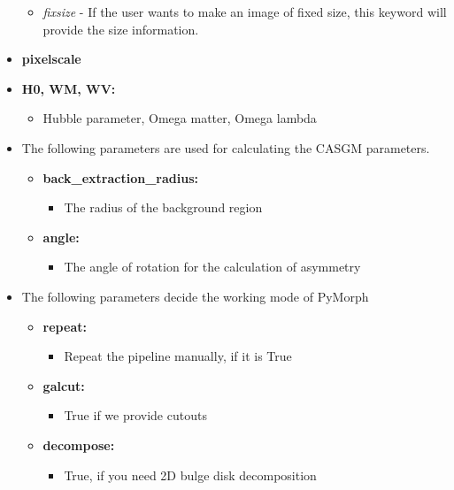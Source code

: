 \documentclass[a4paper,12pt]{article}
\begin{document}
\begin{itemize}
\begin{itemize}
\item \textit{ fixsize} - If the user wants to make an image of fixed size,
 this keyword will provide the size information.

\end{itemize}

\item \textbf{pixelscale}
\item \textbf{H0, WM, WV:}
\begin{itemize}
\item[] Hubble parameter, Omega matter, Omega lambda
\end{itemize}

\item The following parameters are used for calculating the CASGM parameters.
\begin{itemize}
\item[] \textbf{back\_extraction\_radius:}
\begin{itemize}
\item The radius of the background region
\end{itemize}
\item[] \textbf{angle:}
\begin{itemize}
\item The angle of rotation for the calculation of asymmetry
\end{itemize}

\end{itemize}

\item The following parameters decide the working mode of PyMorph
\begin{itemize}
\item[] \textbf{repeat:}
\begin{itemize}
\item Repeat the pipeline manually, if it is True
\end{itemize}

\item[] \textbf{galcut:}
\begin{itemize}
\item True if we provide cutouts
\end{itemize}

\item[] \textbf{decompose:}
\begin{itemize}
\item True, if you need 2D bulge disk decomposition
\end{itemize}


\end{itemize}
\end{itemize}
\end{document}

